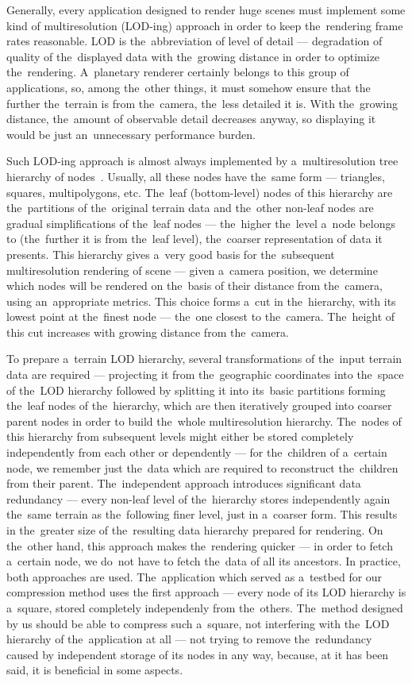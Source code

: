 Generally, every application designed to render huge scenes must implement some kind of multiresolution (LOD-ing) approach in order to keep the~rendering frame rates reasonable. LOD is the~abbreviation of level of detail --- degradation of quality of the~displayed data with the~growing distance in order to optimize the~rendering. A~planetary renderer certainly belongs to this group of applications, so, among the~other things, it must somehow ensure that the further the~terrain is from the~camera, the~less detailed it is. With the~growing distance, the~amount of observable detail decreases anyway, so displaying it would be just an~unnecessary performance burden. 

Such LOD-ing approach is almost always implemented by a~multiresolution tree hierarchy of nodes~\cite{survey}. Usually, all these nodes have the~same form --- triangles, squares, multipolygons, etc. The~leaf (bottom-level) nodes of this hierarchy are the~partitions of the~original terrain data and the~other non-leaf nodes are gradual simplifications of the~leaf nodes --- the~higher the~level a~node belongs to (the~further it is from the~leaf level), the~coarser representation of data it presents. This hierarchy gives a~very good basis for the~subsequent multiresolution rendering of scene --- given a~camera position, we determine which nodes will be rendered on the~basis of their distance from the~camera, using an~appropriate metrics. This choice forms a~cut in the~hierarchy, with its lowest point at the~finest node --- the~one closest to the~camera. The~height of this cut increases with growing distance from the~camera. 

To prepare a~terrain LOD hierarchy, several transformations of the~input terrain data are required --- projecting it from the~geographic coordinates into the~space of the~LOD hierarchy followed by splitting it into its~basic partitions forming the~leaf nodes of the~hierarchy, which are then iteratively grouped into coarser parent nodes in order to build the~whole multiresolution hierarchy. The~nodes of this hierarchy from subsequent levels might either be stored completely independently from each other or dependently --- for the~children of a~certain node, we remember just the~data which are required to reconstruct the~children from their parent. The~independent approach introduces significant data redundancy --- every non-leaf level of the~hierarchy stores independently again the~same terrain as the~following finer level, just in a~coarser form. This results in the~greater size of the~resulting data hierarchy prepared for rendering. On the~other hand, this approach makes the~rendering quicker --- in order to fetch a~certain node, we do~not have to fetch the~data of all its ancestors. In practice, both approaches are used. The~application which served as a~testbed for our compression method uses the first approach --- every node of its LOD hierarchy is a~square, stored completely independenly from the~others. The~method designed by us should be able to compress such a~square, not interfering with the~LOD hierarchy of the~application at all --- not trying to remove the~redundancy caused by independent storage of its nodes in any way, because, at it has been said, it is beneficial in some aspects.

